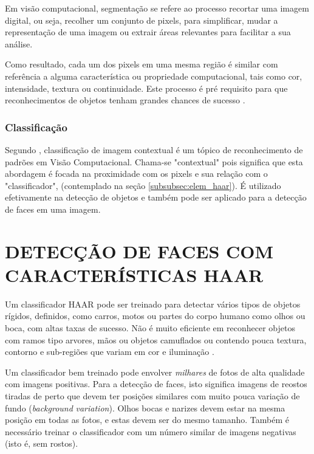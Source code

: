 Em visão computacional, segmentação se refere ao processo recortar uma imagem digital, ou seja, recolher um conjunto de pixels, para simplificar, mudar a representação de uma imagem ou extrair áreas relevantes para facilitar a sua análise. 

Como resultado, cada um dos pixels em uma mesma região é similar com referência a alguma característica ou propriedade computacional, tais como cor, intensidade, textura ou continuidade. Este processo é pré requisito para que reconhecimentos de objetos tenham grandes chances de sucesso \cite{gonzalez_woods}.

\subsubsection{Classificação}\label{subsubsec:classificacao}

Segundo \cite{edinburgh_classifier}, classificação de imagem contextual é um tópico de reconhecimento de padrões em  Visão Computacional. Chama-se "contextual" pois significa que esta abordagem é focada na proximidade com os pixels e sua relação com o "classificador", (contemplado na seção \autoref{subsubsec:elem_haar}). É utilizado efetivamente na detecção de objetos e também pode ser aplicado para a detecção de faces em uma imagem.




\section{DETECÇÃO DE FACES COM CARACTERÍSTICAS HAAR}\label{sec:deteccao}

Um classificador HAAR pode ser treinado para detectar vários tipos de objetos rígidos, definidos, como carros, motos ou partes do corpo humano como olhos ou boca, com altas taxas de sucesso. Não é muito eficiente em reconhecer objetos com ramos tipo arvores, mãos ou objetos camuflados ou contendo pouca textura, contorno e sub-regiões que variam em cor e iluminação \cite{drmathew_java_programming}.

Um classificador bem treinado pode envolver \textit{milhares} de fotos de alta qualidade com imagens positivas. Para a detecção de faces, isto significa imagens de reostos tiradas de perto que devem ter posições similares com muito pouca variação de fundo (\textit{background} \textit{variation}). Olhos bocas e narizes devem estar na mesma posição em todas as fotos, e estas devem ser do mesmo tamanho. Também é necessário treinar o classificador com um número similar de imagens negativas (isto é, sem rostos).

